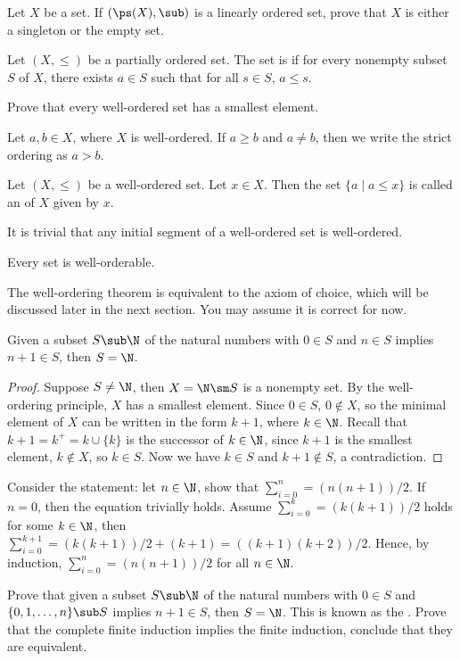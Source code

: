 \documentclass[10pt]{article}
\begin{document}
\begin{problem}
    Let $X$ be a set. If $(\ps(X),\sub)$ is a linearly ordered set, prove that $X$ is either a singleton or the empty set.
\end{problem}
\begin{definition}
    Let $(X,\le)$ be a partially ordered set. The set is  if for every nonempty subset $S$ of $X$, there exists $a\in S$ such that for all $s\in S$, $a\le s$.
\end{definition}
\begin{problem}
    Prove that every well-ordered set has a smallest element.
\end{problem}
\par
Let $a,b\in X$, where $X$ is well-ordered. If $a\ge b$ and $a\ne b$, then we write the strict ordering as $a>b$.
\begin{definition}
    Let $(X,\le)$ be a well-ordered set. Let $x\in X$. Then the set $\{a\mid a\le x\}$ is called an  of $X$ given by $x$.
\end{definition}
\par
It is trivial that any initial segment of a well-ordered set is well-ordered.
\begin{theorem}
    Every set is well-orderable.
\end{theorem}
\par
The well-ordering theorem is equivalent to the axiom of choice, which will be discussed later in the next section. You may assume it is correct for now. 
\begin{theorem}
    Given a subset $S\sub\N$ of the natural numbers with $0\in S$ and $n\in S$ implies $n+1\in S$, then $S=\N$.
\end{theorem}
\begin{proof}
    Suppose $S\ne\N$, then $X=\N\sm S$ is a nonempty set. By the well-ordering principle, $X$ has a smallest element. Since $0\in S$, $0\notin X$, so the minimal element of $X$ can be written in the form $k+1$, where $k\in\N$. Recall that $k+1={k}^{+}=k\cup\{k\}$ is the successor of $k\in\N$, since $k+1$ is the smallest element, $k\notin X$, so $k\in S$. Now we have $k\in S$ and $k+1\notin S$, a contradiction.
\end{proof}
\begin{example}
    Consider the statement: let $n\in\N$, show that ${\sum}_{i=0}^{n}=(n(n+1))/2$. If $n=0$, then the equation trivially holds. Assume ${\sum}_{i=0}^{k}=(k(k+1))/2$ holds for some $k\in\N$, then ${\sum}_{i=0}^{k+1}=(k(k+1))/2+(k+1)=((k+1)(k+2))/2$. Hence, by induction, ${\sum}_{i=0}^{n}=(n(n+1))/2$ for all $n\in\N$.
\end{example}
\begin{problem}
    Prove that given a subset $S\sub\N$ of the natural numbers with $0\in S$ and $\{0,1,\dots,n\}\sub S$ implies $n+1\in S$, then $S=\N$. This is known as the . Prove that the complete finite induction implies the finite induction, conclude that they are equivalent.
\end{problem}
\end{document}
